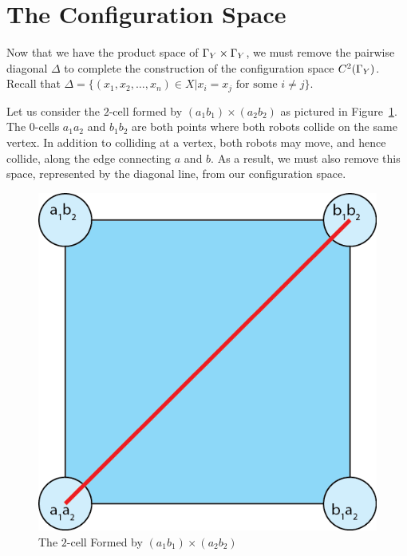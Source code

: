 \newpage

\newpage
\section{The Configuration Space}

Now that we have the product space of $\Gamma_Y \times \Gamma_Y$, we must remove the pairwise diagonal $\Delta$ to complete the construction of the configuration space $C^2(\Gamma_Y)$. Recall that $\Delta = \{(x_1,x_2,\dots, x_n)\in X | x_i = x_j\text{ for some } i \neq j\}$.

Let us consider the $2$-cell formed by $(a_1b_1)\times (a_2b_2)$ as pictured in Figure~\ref{fig:twosaywhat}. The $0$-cells $a_1a_2$ and $b_1b_2$ are both points where both robots collide on the same vertex. In addition to colliding at a vertex, both robots may move, and hence collide, along the edge connecting $a$ and $b$. As a result, we must also remove this space, represented by the diagonal line, from our configuration space. 

\begin{figure}[h]
\caption{The $2$-cell Formed by $(a_1b_1)\times (a_2b_2)$ }\label{fig:twosaywhat}
\centering
\hspace{.5in}
\includegraphics[scale=.3]{Export.png}
\end{figure}

